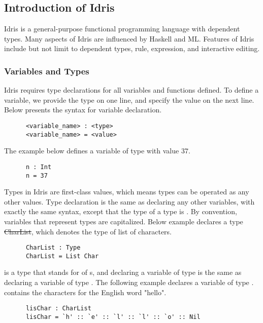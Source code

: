 \subsection{Introduction of Idris}
Idris is a general-purpose functional programming language with dependent types. Many aspects of Idris are influenced by Haskell and ML. Features of Idris include but not limit to dependent types,  rule,  expression, and interactive editing. 

\subsubsection*{Variables and Types}
Idris requires type declarations for all variables and functions defined. To define a variable, we provide the type on one line, and specify the value on the next line. Below presents the syntax for variable declaration. 
\begin{lstlisting}
      <variable_name> : <type> 
      <variable_name> = <value>
\end{lstlisting}
The example below defines a variable  of type  with value $37$. 
\begin{lstlisting}
      n : Int
      n = 37
\end{lstlisting}

Types in Idris are first-class values, which means types can be operated as any other values. Type declaration is the same as declaring any other variables, with exactly the same syntax, except that the type of a type is . By convention, variables that represent types are capitalized. Below example declares a type \st{CharList}, which denotes the type of list of characters. 
\begin{lstlisting}
      CharList : Type
      CharList = List Char
\end{lstlisting}

 is a type that stands for  of s, and declaring a variable of type  is the same as declaring a variable of type . The following example declares a variable  of type .  contains the characters for the English word "hello". 
\begin{lstlisting}
      lisChar : CharList 
      lisChar = `h' :: `e' :: `l' :: `l' :: `o' :: Nil
\end{lstlisting}



